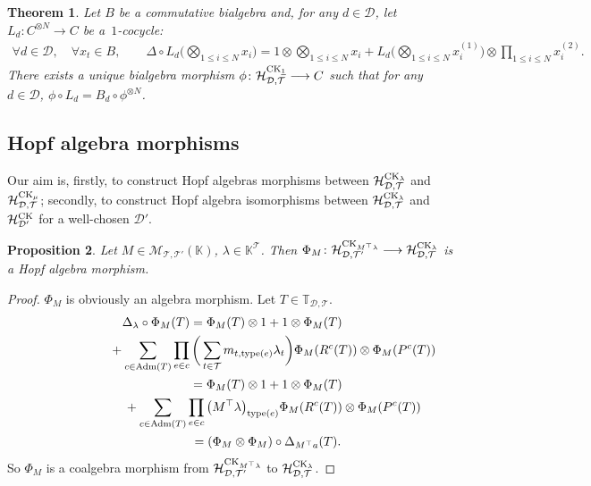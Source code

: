 \documentclass[10pt,a4paper]{amsart}
\numberwithin{equation}{section}
\newtheorem{Theorem}{Theorem}[section]
\newtheorem{Proposition}[Theorem]{Proposition}
 { \theoremstyle{definition}
\newtheorem{Definition}[Theorem]{Definition}
\newtheorem{Note}[Theorem]{Note}
\newtheorem{Example}[Theorem]{Example}
\newtheorem{Remark}[Theorem]{Remark}
\newtheorem{Notation}[Theorem]{Notation}}
\newcommand{\K}{\mathbb{K}}
\newcommand{\T}{\mathcal{T}}
\newcommand{\D}{\mathcal{D}}
\newcommand{\adm}{\mathrm{Adm}}
\newcommand{\h}{\mathcal{H}}
\newcommand{\bfT}{\mathbb{T}}
\newcommand{\M}{\mathcal{M}}
\newcommand{\type}{\mathrm{type}}
\begin{document}
\begin{Theorem} \label{theo22}
Let $B$ be a commutative bialgebra and, for any $d\in \D$, let $L_d\colon C^{\otimes N}\longrightarrow C$ be a~$1$-cocycle:
\begin{gather*}
\forall d\in \D,\quad\forall x_t\in B,\qquad
\Delta \circ L_d\Big( \bigotimes_{1\leq i \leq N} x_i\Big)
=1\otimes \bigotimes_{1\leq i \leq N} x_i+ L_d\Big( \bigotimes_{1\leq i \leq N} x_i^{(1)}\Big)
\otimes \prod_{1\leq i \leq N} x_i^{(2)}.
\end{gather*}
There exists a unique bialgebra morphism $\phi\colon \h_{\D,\T}^{{\rm CK}_{\underline{1}}}\longrightarrow C$
such that for any $d\in \D$, $\phi\circ L_d=B_d \circ\phi^{\otimes N}$.
\end{Theorem}

\subsection{Hopf algebra morphisms}

Our aim is, firstly, to construct Hopf algebras morphisms between
$\h_{\D,\T}^{{\rm CK}_\lambda}$ and $\h_{\D,\T}^{{\rm CK}_\mu}$;
secondly, to construct Hopf algebra isomorphisms between $\h_{\D,\T}^{{\rm CK}_\lambda}$
and $\h_{\D'}^{{\rm CK}}$ for a well-chosen $\D'$.

\begin{Proposition}
Let $M\in \M_{\T,\T'}(\K)$, $\lambda\in \K^{\T}$. Then $\Phi_M\colon \h_{\D,\T'}
^{{\rm CK}_{M^\top \lambda}}\longrightarrow \h_{\D,\T}^{{\rm CK}_\lambda}$ is a Hopf algebra morphism.
\end{Proposition}

\begin{proof} $\Phi_M$ is obviously an algebra morphism. Let $T\in \bfT_{\D,\T}$.
\begin{gather*}
\Delta_\lambda\circ \Phi_M(T)=\Phi_M(T)\otimes 1+1\otimes \Phi_M(T)
\\ \hphantom{\Delta_\lambda\circ \Phi_M(T)=}
{}+\sum_{c\in \adm(T)} \prod_{e\in c}\bigg(\sum_{t\in \T} m_{t,\type(e)}\lambda_t\bigg)
\Phi_M(R^c(T))\otimes \Phi_M(P^c(T))
\\ \hphantom{\Delta_\lambda\circ \Phi_M(T)}
{}=\Phi_M(T)\otimes 1+1\otimes \Phi_M(T)
\\ \hphantom{\Delta_\lambda\circ \Phi_M(T)=}
{}+\sum_{c\in \adm(T)} \prod_{e\in c}\big(M^\top \lambda\big)_{\type(e)} \Phi_M(R^c(T))\otimes \Phi_M(P^c(T))
\\ \hphantom{\Delta_\lambda\circ \Phi_M(T)}
{}=(\Phi_M\otimes \Phi_M)\circ \Delta_{M^\top a}(T).
\end{gather*}
So $\Phi_M$ is a coalgebra morphism from $\h_{\D,\T'}^{{\rm CK}_{M^\top \lambda}}$ to $\h_{\D,\T}^{{\rm CK}_\lambda}$. \end{proof}
\end{document}
